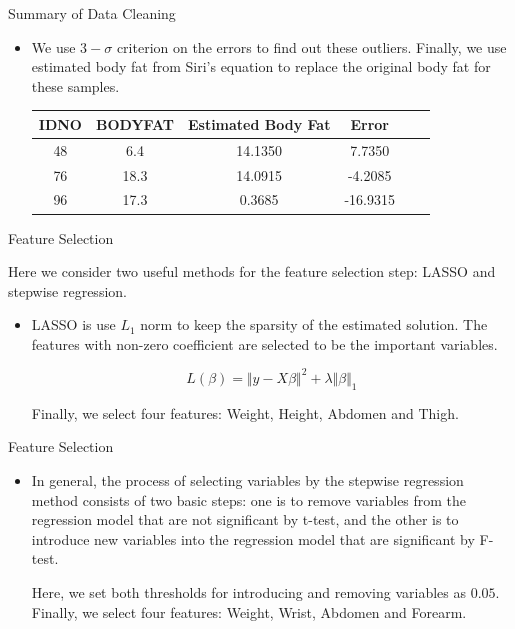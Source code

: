\documentclass{beamer}
\begin{document}
\begin{frame}{Summary of Data Cleaning}

\begin{itemize}
\item We use $3-\sigma$ criterion on the errors to find out these outliers. Finally, we use estimated body fat from Siri's equation to replace the original body fat for these samples.
\newline

\begin{tabular}{cccccc}
   \toprule
   IDNO & BODYFAT & Estimated Body Fat & Error\\
   \midrule
   48 & 6.4 & 14.1350 & 7.7350 \\
   76 & 18.3 & 14.0915 & -4.2085 \\   
   96 & 17.3 & 0.3685 & -16.9315 \\
   \bottomrule
\end{tabular}
\end{itemize}

\end{frame}

\begin{frame}{Feature Selection}

Here we consider two useful methods for the feature selection step: LASSO and stepwise regression.

\begin{itemize}
\item LASSO is use $L_1$ norm to keep the sparsity of the estimated solution. The features with non-zero coefficient are selected to be the important variables.

$$
L(\beta) = \Vert y-X\beta\Vert^2+\lambda \Vert\beta\Vert_1
$$

Finally, we select four features: Weight, Height, Abdomen and Thigh.

\end{itemize}
\end{frame}

\begin{frame}{Feature Selection}
\begin{itemize}

\item In general, the process of selecting variables by the stepwise regression method consists of two basic steps: one is to remove variables from the regression model that are not significant by t-test, and the other is to introduce new variables into the regression model that are significant by F-test.
\newline

Here, we set both thresholds for introducing and removing variables as $0.05$. Finally, we select four features: Weight, Wrist, Abdomen and Forearm.

\end{itemize}
\end{frame}
\end{document}

